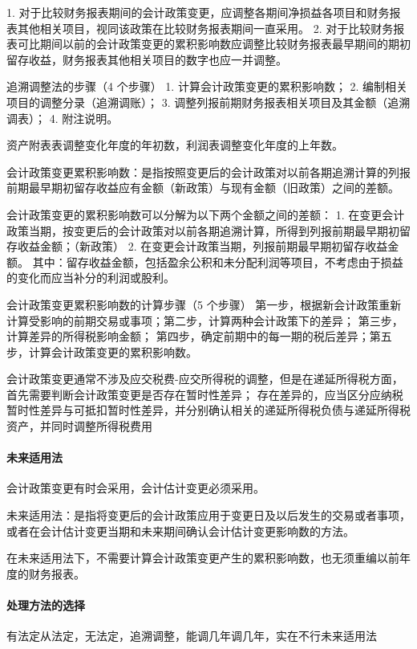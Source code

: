 \documentclass[UTF8,12pt]{ctexart}
\numberwithin{equation}{section} %
\numberwithin{figure}{section}
\numberwithin{table}{section}
\begin{document}
	1.	对于比较财务报表期间的会计政策变更，应调整各期间净损益各项目和财务报表其他相关项目，视同该政策在比较财务报表期间一直采用。
	2.	对于比较财务报表可比期间以前的会计政策变更的累积影响数应调整比较财务报表最早期间的期初留存收益，财务报表其他相关项目的数字也应一并调整。
	
	追溯调整法的步骤（4 个步骤）
	1.	计算会计政策变更的累积影响数；
	2.	编制相关项目的调整分录（追溯调账）；
	3.	调整列报前期财务报表相关项目及其金额（追溯调表）；
	4.	附注说明。
	
	资产附表表调整变化年度的年初数，利润表调整变化年度的上年数。
	
	会计政策变更累积影响数：是指按照变更后的会计政策对以前各期追溯计算的列报前期最早期初留存收益应有金额（新政策）与现有金额（旧政策）之间的差额。
	
	会计政策变更的累积影响数可以分解为以下两个金额之间的差额：
	1.	在变更会计政策当期，按变更后的会计政策对以前各期追溯计算，所得到列报前期最早期初留存收益金额；（新政策）
	2.	在变更会计政策当期，列报前期最早期初留存收益金额。
	其中：留存收益金额，包括盈余公积和未分配利润等项目，不考虑由于损益的变化而应当补分的利润或股利。
	
	会计政策变更累积影响数的计算步骤（5 个步骤）
	第一步，根据新会计政策重新计算受影响的前期交易或事项；第二步，计算两种会计政策下的差异；
	第三步，计算差异的所得税影响金额；
	第四步，确定前期中的每一期的税后差异；第五步，计算会计政策变更的累积影响数。
	
	会计政策变更通常不涉及应交税费-应交所得税的调整，但是在递延所得税方面，首先需要判断会计政策变更是否存在暂时性差异；
	存在差异的，应当区分应纳税暂时性差异与可抵扣暂时性差异，并分别确认相关的递延所得税负债与递延所得税资产，并同时调整所得税费用
	
	\paragraph{未来适用法}
	会计政策变更有时会采用，会计估计变更必须采用。
	
	未来适用法：是指将变更后的会计政策应用于变更日及以后发生的交易或者事项，或者在会计估计变更当期和未来期间确认会计估计变更影响数的方法。
	
	在未来适用法下，不需要计算会计政策变更产生的累积影响数，也无须重编以前年度的财务报表。
	
	\paragraph{处理方法的选择}
	有法定从法定，无法定，追溯调整，能调几年调几年，实在不行未来适用法
	
\end{document}
